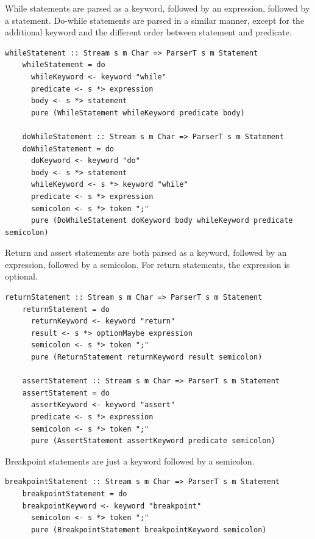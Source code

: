 \documentclass[UdineBachThesis,american,11pt]{PhdThesis}
\begin{document}
  While statements are parsed as a \lstinline@while@ keyword, followed by an
  expression, followed by a statement. Do-while statements are parsed in a
  similar manner, except for the additional \lstinline@do@ keyword and the
  different order between statement and predicate.

  \begin{lstlisting}[gobble=4,basicstyle=\ttfamily\small]
    whileStatement :: Stream s m Char => ParserT s m Statement
    whileStatement = do
      whileKeyword <- keyword "while"
      predicate <- s *> expression
      body <- s *> statement
      pure (WhileStatement whileKeyword predicate body)

    doWhileStatement :: Stream s m Char => ParserT s m Statement
    doWhileStatement = do
      doKeyword <- keyword "do"
      body <- s *> statement
      whileKeyword <- s *> keyword "while"
      predicate <- s *> expression
      semicolon <- s *> token ";"
      pure (DoWhileStatement doKeyword body whileKeyword predicate semicolon)
  \end{lstlisting}

  Return and assert statements are both parsed as a keyword, followed by an
  expression, followed by a semicolon. For return statements, the expression is
  optional.

  \begin{lstlisting}[gobble=4,basicstyle=\ttfamily\small]
    returnStatement :: Stream s m Char => ParserT s m Statement
    returnStatement = do
      returnKeyword <- keyword "return"
      result <- s *> optionMaybe expression
      semicolon <- s *> token ";"
      pure (ReturnStatement returnKeyword result semicolon)

    assertStatement :: Stream s m Char => ParserT s m Statement
    assertStatement = do
      assertKeyword <- keyword "assert"
      predicate <- s *> expression
      semicolon <- s *> token ";"
      pure (AssertStatement assertKeyword predicate semicolon)
  \end{lstlisting}

  Breakpoint statements are just a \lstinline@breakpoint@ keyword followed by a
  semicolon.

  \begin{lstlisting}[gobble=4,basicstyle=\ttfamily\small]
    breakpointStatement :: Stream s m Char => ParserT s m Statement
    breakpointStatement = do
    breakpointKeyword <- keyword "breakpoint"
      semicolon <- s *> token ";"
      pure (BreakpointStatement breakpointKeyword semicolon)
  \end{lstlisting}
\end{document}
